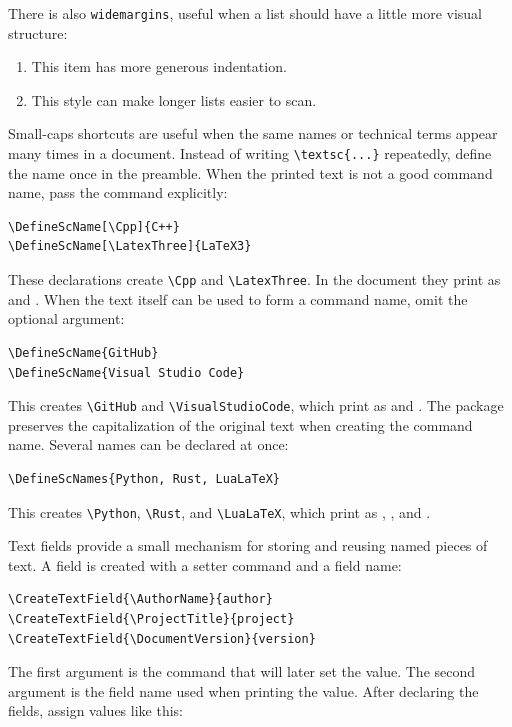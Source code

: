 \documentclass[a4paper,11pt]{article}
\begin{document}
There is also \verb|widemargins|, useful when a list should have a little more
visual structure:

\begin{enumerate}[widemargins]
  \item This item has more generous indentation.
  \item This style can make longer lists easier to scan.
\end{enumerate}

Small-caps shortcuts are useful when the same names or technical terms appear
many times in a document.  Instead of writing \verb|\textsc{...}| repeatedly,
define the name once in the preamble.  When the printed text is not a good
command name, pass the command explicitly:

\begin{verbatim}
\DefineScName[\Cpp]{C++}
\DefineScName[\LatexThree]{LaTeX3}
\end{verbatim}

These declarations create \verb|\Cpp| and \verb|\LatexThree|.  In the document
they print as \Cpp{} and \LatexThree.  When the text itself can be used to form
a command name, omit the optional argument:

\begin{verbatim}
\DefineScName{GitHub}
\DefineScName{Visual Studio Code}
\end{verbatim}

This creates \verb|\GitHub| and \verb|\VisualStudioCode|, which print as
\GitHub{} and \VisualStudioCode.  The package preserves the capitalization of
the original text when creating the command name.  Several names can be declared
at once:

\begin{verbatim}
\DefineScNames{Python, Rust, LuaLaTeX}
\end{verbatim}

This creates \verb|\Python|, \verb|\Rust|, and \verb|\LuaLaTeX|, which print as
\Python, \Rust, and \LuaLaTeX.

Text fields provide a small mechanism for storing and reusing named pieces of
text.  A field is created with a setter command and a field name:

\begin{verbatim}
\CreateTextField{\AuthorName}{author}
\CreateTextField{\ProjectTitle}{project}
\CreateTextField{\DocumentVersion}{version}
\end{verbatim}

The first argument is the command that will later set the value.  The second
argument is the field name used when printing the value.  After declaring the
fields, assign values like this:
\end{document}
